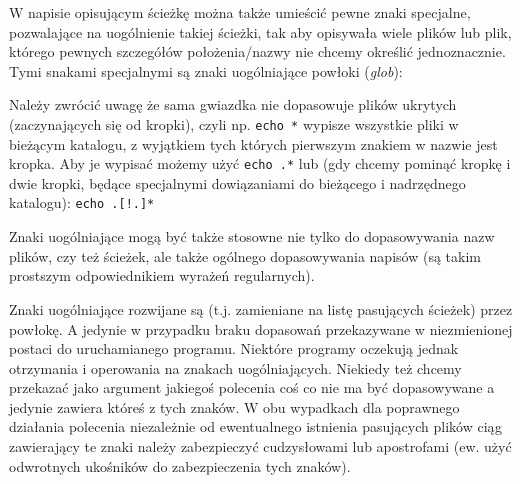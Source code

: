 W napisie opisującym ścieżkę można także umieścić pewne znaki specjalne, pozwalające na uogólnienie takiej ścieżki, tak aby opisywała wiele plików lub plik, którego pewnych szczegółów położenia/nazwy nie chcemy określić jednoznacznie. Tymi snakami specjalnymi są znaki uogólniające powłoki (\textit{glob}):

Należy zwrócić uwagę że sama gwiazdka nie dopasowuje plików ukrytych (zaczynających się od kropki), czyli np. \Verb$echo *$ wypisze wszystkie pliki w bieżącym katalogu, z wyjątkiem tych których pierwszym znakiem w nazwie jest kropka. Aby je wypisać możemy użyć \Verb$echo .*$ lub (gdy chcemy pominąć kropkę i dwie kropki, będące specjalnymi dowiązaniami do bieżącego i nadrzędnego katalogu):  \Verb$echo .[!.]*$

Znaki uogólniające mogą być także stosowne nie tylko do dopasowywania nazw plików, czy też ścieżek, ale także ogólnego dopasowywania napisów (są takim prostszym odpowiednikiem wyrażeń regularnych).

Znaki uogólniające rozwijane są (t.j. zamieniane na listę pasujących ścieżek) przez powłokę. A jedynie w przypadku braku dopasowań przekazywane w niezmienionej postaci do uruchamianego programu.
Niektóre programy oczekują jednak otrzymania i operowania na znakach uogólniających. Niekiedy też chcemy przekazać jako argument jakiegoś polecenia coś co nie ma być dopasowywane a jedynie zawiera któreś z tych znaków.
W obu wypadkach dla poprawnego działania polecenia niezależnie od ewentualnego istnienia pasujących plików ciąg zawierający te znaki należy zabezpieczyć cudzysłowami lub apostrofami (ew. użyć odwrotnych ukośników do zabezpieczenia tych znaków).

